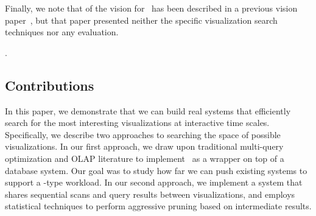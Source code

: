 Finally, we note that of the vision for \SeeDB\ has been described in a previous vision paper~\cite{DBLP:conf/vldb/Parameswaran2013}, but
that paper presented neither the specific visualization search techniques nor any evaluation.





.

\subsection*{Contributions}

In this paper, we demonstrate that we can build real systems that efficiently search for the most
interesting visualizations at interactive time scales.
Specifically, we describe two approaches to searching the space of possible visualizations.
In our first approach, we draw upon traditional multi-query optimization and OLAP literature to implement \SeeDB\ 
as a wrapper on top of a database system. Our goal was to study how far we can push existing systems to support a
\SeeDB-type workload.
In our second approach, we implement a system that  shares sequential scans and query results between visualizations, and 
employs statistical techniques to perform aggressive pruning based on intermediate results.

